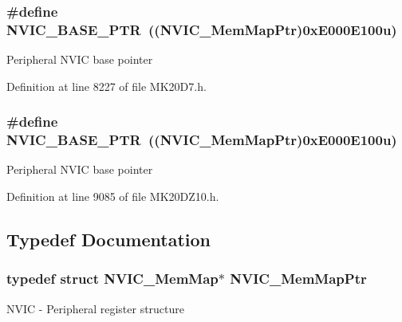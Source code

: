 \subsubsection[{\texorpdfstring{N\+V\+I\+C\+\_\+\+B\+A\+S\+E\+\_\+\+P\+TR}{NVIC_BASE_PTR}}]{\setlength{\rightskip}{0pt plus 5cm}\#define N\+V\+I\+C\+\_\+\+B\+A\+S\+E\+\_\+\+P\+TR~(({\bf N\+V\+I\+C\+\_\+\+Mem\+Map\+Ptr})0x\+E000\+E100u)}\hypertarget{group___n_v_i_c___peripheral_ga28f0a055d0c218e16d1fc7b13ff0caa5}{}\label{group___n_v_i_c___peripheral_ga28f0a055d0c218e16d1fc7b13ff0caa5}
Peripheral N\+V\+IC base pointer 

Definition at line 8227 of file M\+K20\+D7.\+h.

\subsubsection[{\texorpdfstring{N\+V\+I\+C\+\_\+\+B\+A\+S\+E\+\_\+\+P\+TR}{NVIC_BASE_PTR}}]{\setlength{\rightskip}{0pt plus 5cm}\#define N\+V\+I\+C\+\_\+\+B\+A\+S\+E\+\_\+\+P\+TR~(({\bf N\+V\+I\+C\+\_\+\+Mem\+Map\+Ptr})0x\+E000\+E100u)}\hypertarget{group___n_v_i_c___peripheral_ga28f0a055d0c218e16d1fc7b13ff0caa5}{}\label{group___n_v_i_c___peripheral_ga28f0a055d0c218e16d1fc7b13ff0caa5}
Peripheral N\+V\+IC base pointer 

Definition at line 9085 of file M\+K20\+D\+Z10.\+h.



\subsection{Typedef Documentation}
\subsubsection[{\texorpdfstring{N\+V\+I\+C\+\_\+\+Mem\+Map\+Ptr}{NVIC_MemMapPtr}}]{\setlength{\rightskip}{0pt plus 5cm}typedef struct {\bf N\+V\+I\+C\+\_\+\+Mem\+Map}$\ast$ {\bf N\+V\+I\+C\+\_\+\+Mem\+Map\+Ptr}}\hypertarget{group___n_v_i_c___peripheral_ga685d87c766bb24fb3330aa8cc48fa0e7}{}\label{group___n_v_i_c___peripheral_ga685d87c766bb24fb3330aa8cc48fa0e7}
N\+V\+IC -\/ Peripheral register structure 
